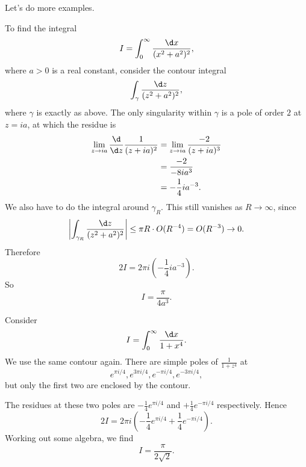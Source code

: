\documentclass[a4paper]{article}
\begin{document}
Let's do more examples.
\begin{eg}
  To find the integral
  \[
    I = \int_0^\infty \frac{\d x}{(x^2 + a^2)^2},
  \]
  where $a > 0$ is a real constant, consider the contour integral
  \[
    \int_{\gamma} \frac{\d z}{(z^2 + a^2)^2},
  \]
  where $\gamma$ is exactly as above. The only singularity within $\gamma$ is a pole of order $2$ at $z = ia$, at which the residue is
  \begin{align*}
    \lim_{z \to ia} \frac{\d}{\d z} \frac{1}{(z + ia)^2} &= \lim_{z \to ia} \frac{-2}{(z + ia)^3} \\
    &= \frac{-2}{-8ia^3} \\
    &=-\frac{1}{4}ia^{-3}.
  \end{align*}
  We also have to do the integral around $\gamma_R$. This still vanishes as $R \to \infty$, since
  \[
    \left|\int_{\gamma_R} \frac{\d z}{(z^2 + a^2)^2}\right| \leq \pi R \cdot O(R^{-4}) = O(R^{-3}) \to 0.
  \]
  Therefore
  \[
    2I = 2\pi i \left(-\frac{1}{4}ia^{-3}\right).
  \]
  So
  \[
    I = \frac{\pi}{4a^3}.
  \]
\end{eg}

\begin{eg}
  Consider
  \[
    I = \int_0^\infty \frac{\d x}{1 + x^4}.
  \]
  We use the same contour again. There are simple poles of $\frac{1}{1 + z^4}$ at
  \[
    e^{\pi i/4}, e^{3\pi i/4}, e^{-\pi i/4}, e^{-3\pi i/4},
  \]
  but only the first two are enclosed by the contour.
  \begin{center}
  \end{center}
  The residues at these two poles are $-\frac{1}{4}e^{\pi i/4}$ and $+\frac{1}{4} e^{-\pi i/4}$ respectively. Hence
  \[
    2 I = 2\pi i \left(-\frac{1}{4}e^{\pi i/4} + \frac{1}{4} e^{-\pi i/4}\right).
  \]
  Working out some algebra, we find
  \[
    I = \frac{\pi}{2\sqrt{2}}.
  \]
\end{eg}
\end{document}
